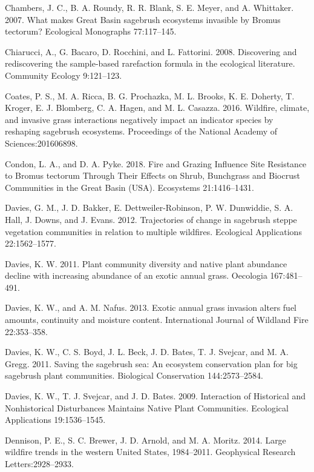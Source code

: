 \documentclass[12pt,]{article}
\begin{document}
\hypertarget{ref-Chambers2007}{}
Chambers, J. C., B. A. Roundy, R. R. Blank, S. E. Meyer, and A.
Whittaker. 2007. What makes Great Basin sagebrush ecosystems invasible
by Bromus tectorum? Ecological Monographs 77:117--145.

\hypertarget{ref-Chiarucci2008}{}
Chiarucci, A., G. Bacaro, D. Rocchini, and L. Fattorini. 2008.
Discovering and rediscovering the sample-based rarefaction formula in
the ecological literature. Community Ecology 9:121--123.

\hypertarget{ref-Coates2016}{}
Coates, P. S., M. A. Ricca, B. G. Prochazka, M. L. Brooks, K. E.
Doherty, T. Kroger, E. J. Blomberg, C. A. Hagen, and M. L. Casazza.
2016. Wildfire, climate, and invasive grass interactions negatively
impact an indicator species by reshaping sagebrush ecosystems.
Proceedings of the National Academy of Sciences:201606898.

\hypertarget{ref-Condon2018}{}
Condon, L. A., and D. A. Pyke. 2018. Fire and Grazing Influence Site
Resistance to Bromus tectorum Through Their Effects on Shrub, Bunchgrass
and Biocrust Communities in the Great Basin (USA). Ecosystems
21:1416--1431.

\hypertarget{ref-Davies2012}{}
Davies, G. M., J. D. Bakker, E. Dettweiler-Robinson, P. W. Dunwiddie, S.
A. Hall, J. Downs, and J. Evans. 2012. Trajectories of change in
sagebrush steppe vegetation communities in relation to multiple
wildfires. Ecological Applications 22:1562--1577.

\hypertarget{ref-Davies2011}{}
Davies, K. W. 2011. Plant community diversity and native plant abundance
decline with increasing abundance of an exotic annual grass. Oecologia
167:481--491.

\hypertarget{ref-Davies2013}{}
Davies, K. W., and A. M. Nafus. 2013. Exotic annual grass invasion
alters fuel amounts, continuity and moisture content. International
Journal of Wildland Fire 22:353--358.

\hypertarget{ref-Davies2011a}{}
Davies, K. W., C. S. Boyd, J. L. Beck, J. D. Bates, T. J. Svejcar, and
M. A. Gregg. 2011. Saving the sagebrush sea: An ecosystem conservation
plan for big sagebrush plant communities. Biological Conservation
144:2573--2584.

\hypertarget{ref-Davies2009}{}
Davies, K. W., T. J. Svejcar, and J. D. Bates. 2009. Interaction of
Historical and Nonhistorical Disturbances Maintains Native Plant
Communities. Ecological Applications 19:1536--1545.

\hypertarget{ref-Dennison2014}{}
Dennison, P. E., S. C. Brewer, J. D. Arnold, and M. A. Moritz. 2014.
Large wildfire trends in the western United States, 1984--2011.
Geophysical Research Letters:2928--2933.
\end{document}
